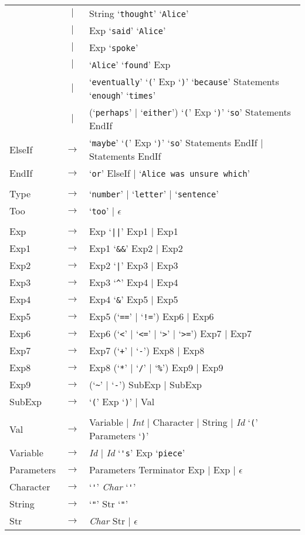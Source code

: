 \documentclass[a4paper,11pt]{article}
\begin{document}
\begin{tabular}{lcl}
            &  $|$  & String `\verb|thought|' `\verb|Alice|' \\
            &  $|$  & Exp `\verb|said|' `\verb|Alice|' \\
            &  $|$  & Exp `\verb|spoke|' \\
            &  $|$  & `\verb:Alice:' `\verb:found:' Exp \\
            &  $|$  & `\verb|eventually|' `\verb|(|' Exp `\verb|)|' `\verb|because|' Statements `\verb|enough|' `\verb|times|' \\
            &  $|$  & (`\verb|perhaps|' $|$ `\verb|either|') `\verb|(|' Exp `\verb|)|' `\verb|so|' Statements EndIf \\
ElseIf      & $\to$ & `\verb|maybe|' `\verb|(|' Exp `\verb|)|' `\verb|so|' Statements EndIf $|$ Statements EndIf \\
EndIf       & $\to$ & `\verb|or|' ElseIf $|$ `\verb|Alice was unsure which|' \\
\\
Type        & $\to$ & `\verb|number|' $|$ `\verb|letter|' $|$ `\verb|sentence|' \\
Too         & $\to$ & `\verb|too|' $|$ $\epsilon$ \\
\\
Exp         & $\to$ & Exp `\verb:||:' Exp1 $|$ Exp1 \\
Exp1        & $\to$ & Exp1 `\verb:&&:' Exp2 $|$ Exp2 \\
Exp2        & $\to$ & Exp2 `\verb:|:' Exp3 $|$ Exp3 \\
Exp3        & $\to$ & Exp3 `\verb:^:' Exp4 $|$ Exp4 \\
Exp4        & $\to$ & Exp4 `\verb:&:' Exp5 $|$ Exp5 \\
Exp5        & $\to$ & Exp5 (`\verb:==:' $|$ `\verb:!=:') Exp6 $|$ Exp6 \\
Exp6        & $\to$ & Exp6 (`\verb:<:' $|$ `\verb:<=:' $|$ `\verb:>:' $|$ `\verb:>=:') Exp7 $|$ Exp7 \\
Exp7        & $\to$ & Exp7 (`\verb:+:' $|$ `\verb:-:') Exp8 $|$ Exp8 \\
Exp8        & $\to$ & Exp8 (`\verb:*:' $|$ `\verb:/:' $|$ `\verb:%:') Exp9 $|$ Exp9 \\
Exp9        & $\to$ & (`\verb:~:' $|$ `\verb:-:') SubExp $|$ SubExp \\
SubExp      & $\to$ & `\verb|(|' Exp `\verb|)|' $|$ Val \\
\\
Val         & $\to$ & Variable $|$ \emph{Int} $|$ Character $|$ String $|$ \emph{Id} `\verb|(|' Parameters `\verb|)|' \\
Variable    & $\to$ & \emph{Id} $|$ \emph{Id} `\verb|'s|' Exp `\verb|piece|' \\
Parameters  & $\to$ & Parameters Terminator Exp $|$ Exp $|$ $\epsilon$ \\
Character   & $\to$ & `\verb|'|' \emph{Char} `\verb|'|' \\
String      & $\to$ & `\verb|"|' Str `\verb|"|' \\
Str         & $\to$ & \emph{Char} Str $|$ $\epsilon$ 
\end{tabular}
\end{document}
